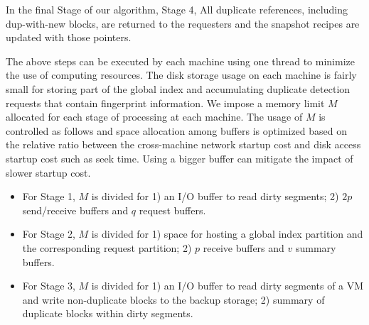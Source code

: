 In the final Stage of our algorithm, Stage 4, All duplicate references,
including dup-with-new blocks, are returned to the requesters and the snapshot
recipes are updated with those pointers.


The above steps can be executed by each machine using one thread to minimize
the use of computing resources.
The  disk storage usage on each machine 
is fairly small for  storing part of the global index and
accumulating  duplicate detection requests that contain fingerprint information.   
We impose a memory limit $M$ allocated for each stage of processing at each machine.
The usage of $M$ is controlled as follows and space allocation among buffers is optimized based on the relative
ratio between the cross-machine network  startup cost and disk access startup cost such as seek time.
Using a bigger buffer  can mitigate the impact of slower startup cost. 
\begin{itemize}
\item For Stage 1, $M$  is divided for 
1) an I/O buffer to read dirty segments; 2) $2p$ send/receive buffers and $q$ request  buffers.

\item 
For Stage 2,  $M$  is divided for 1) space for hosting a global index partition and 
the corresponding request partition; 2) $p$ receive buffers and $v$ summary buffers.

\item For Stage 3, $M$  is divided for 1) an I/O buffer to read dirty segments of a VM and   
write non-duplicate blocks to the  backup storage;
2) summary of duplicate blocks within dirty segments. 
\end{itemize}

